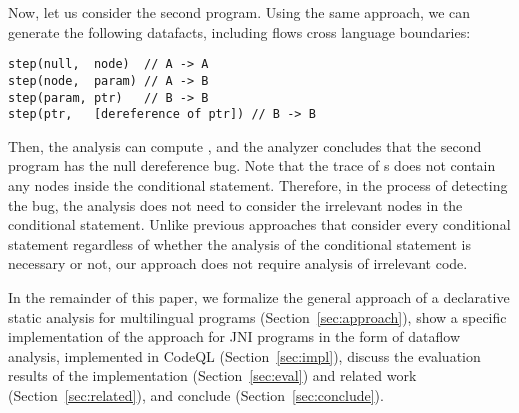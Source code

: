 Now, let us consider the second program. Using the same approach, we
can generate the following datafacts, including flows cross language boundaries:

\begin{lstlisting}[style=myDatalog,xleftmargin=2.5em]
step(null,  node)  // A -> A
step(node,  param) // A -> B
step(param, ptr)   // B -> B
step(ptr,   [dereference of ptr]) // B -> B
\end{lstlisting}
Then, the analysis can compute
,
and the analyzer concludes that the second program has the null dereference bug.
Note that the trace of s does not contain any nodes
inside the conditional statement.  Therefore, in the process of
detecting the bug, the analysis does not need to consider the
irrelevant nodes in the conditional statement.
Unlike previous approaches that consider every conditional statement
regardless of whether the analysis of the conditional statement is
necessary or not, our approach does not require analysis of irrelevant code.

In the remainder of this paper, we formalize the general approach of a
declarative static analysis for multilingual programs (Section~\ref{sec:approach}), show a
specific implementation of the approach for JNI programs in the form of dataflow
analysis, implemented in CodeQL (Section~\ref{sec:impl}), discuss the evaluation results of
the implementation (Section~\ref{sec:eval}) and related work (Section~\ref{sec:related}), and
conclude (Section~\ref{sec:conclude}).
